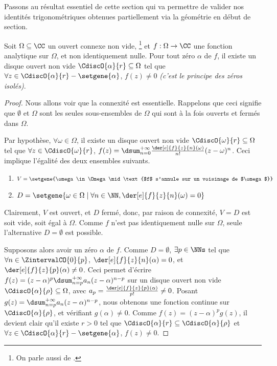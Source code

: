 

Passons au résultat essentiel de cette section qui va permettre de valider nos identités trigonométriques obtenues partiellement via la géométrie en début de section.


\begin{fact} \label{isolated-zero}
    Soit $\Omega \subseteq \CC$ un ouvert connexe non vide,%
    \footnote{
    	On parle aussi de .
    }
    et
    $f: \Omega \rightarrow \CC$ une fonction analytique sur $\Omega$, et non identiquement nulle.
	Pour tout zéro $\alpha$ de $f$, il existe un disque ouvert non vide $\CdiscO{\alpha}{r} \subseteq \Omega$ tel que 
	$\forall z \in \CdiscO{\alpha}{r} - \setgene{\alpha}$, $f(z) \neq 0$
	\emph{(c'est le principe des zéros isolés)}.  
\end{fact}


\begin{proof}
	Nous allons voir que la connexité est essentielle. Rappelons que ceci signifie que $\emptyset$ et $\Omega$ sont les seules sous-ensembles de $\Omega$ qui sont à la fois ouverts et fermés dans $\Omega$.
	
	\smallskip
	
	Par hypothèse, 
	$\forall \omega \in \Omega$, il existe un disque ouvert non vide $\CdiscO{\omega}{r} \subseteq \Omega$ tel que 
	$\forall z \in \CdiscO{\omega}{r}$, 
	$f(z) = \dsum_{n = 0}^{+\infty} \frac{\der[e]{f}{z}{n}(\omega)}{n!} (z - \omega)^n$.
	Ceci implique l'égalité des deux ensembles suivants.
	\begin{enumerate}
		\item $V = \setgene{\omega \in \Omega \mid \text{$f$ s'annule sur un voisinage de $\omega$}}$

		\item $D = \setgene{\omega \in \Omega \mid \forall n \in \NN, \der[e]{f}{z}{n}(\omega) = 0}$
	\end{enumerate}
		
	Clairement,
	$V$ est ouvert, et $D$ fermé, donc, par raison de connexité, $V = D$ est soit vide, soit égal à $\Omega$.
	Comme $f$ n'est pas identiquement nulle sur $\Omega$, seule l'alternative $D = \emptyset$ est possible.

	\smallskip
	
	Supposons alors avoir un zéro $\alpha$ de $f$. 
	Comme $D = \emptyset$, $\exists p \in \NNs$ tel que 
	$\forall n \in \ZintervalCO{0}{p}$, $\der[e]{f}{z}{n}(\alpha) = 0$,
	et
	$\der[e]{f}{z}{p}(\alpha) \neq 0$.
	Ceci permet d'écrire
	$f(z) = (z - \alpha)^p \dsum_{n = p}^{+\infty} a_n (z - \alpha)^{n - p}$
	sur un disque ouvert non vide $\CdiscO{\alpha}{\rho} \subseteq \Omega$,
	avec $a_p = \frac{\der[e]{f}{z}{p}(\alpha)}{p!} \neq 0$.
	Posant $g(z) = \dsum_{n = p}^{+\infty} a_n (z - \alpha)^{n - p}$, nous obtenons une fonction continue sur $\CdiscO{\alpha}{\rho}$, et vérifiant $g(\alpha) \neq 0$.
	Comme $f(z) = (z - \alpha)^p g(z)$, il devient clair qu'il existe $r > 0$ tel que
	$\CdiscO{\alpha}{r} \subseteq \CdiscO{\alpha}{\rho}$
	et
	$\forall z \in \CdiscO{\alpha}{r} - \setgene{\alpha}$, $f(z) \neq 0$.
\end{proof}


